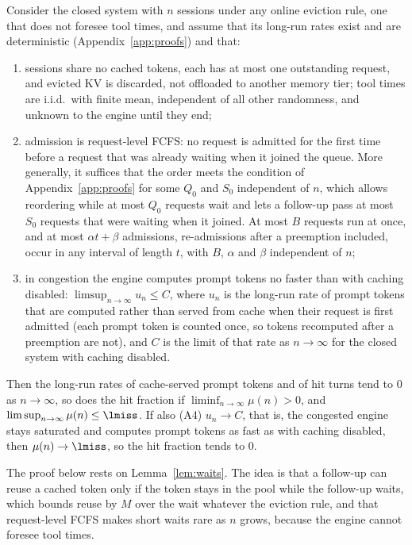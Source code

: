 \begin{proposition}\label{prop:A}
Consider the closed system with $n$ sessions under any online eviction rule, one that does not foresee tool times, and assume that its long-run rates exist and are deterministic (Appendix~\ref{app:proofs}) and that:
\begin{enumerate}[label=(A\arabic*),leftmargin=*]
\item sessions share no cached tokens, each has at most one outstanding request, and evicted KV is discarded, not offloaded to another memory tier; tool times are i.i.d.\ with finite mean, independent of all other randomness, and unknown to the engine until they end;
\item admission is request-level FCFS: no request is admitted for the first time before a request that was already waiting when it joined the queue. More generally, it suffices that the order meets the condition of Appendix~\ref{app:proofs} for some $Q_0$ and $S_0$ independent of $n$, which allows reordering while at most $Q_0$ requests wait and lets a follow-up pass at most $S_0$ requests that were waiting when it joined. At most $B$ requests run at once, and at most $\alpha t+\beta$ admissions, re-admissions after a preemption included, occur in any interval of length $t$, with $B$, $\alpha$ and $\beta$ independent of $n$;
\item in congestion the engine computes prompt tokens no faster than with caching disabled: $\limsup_{n\to\infty}u_n\le C$, where $u_n$ is the long-run rate of prompt tokens that are computed rather than served from cache when their request is first admitted (each prompt token is counted once, so tokens recomputed after a preemption are not), and $C$ is the limit of that rate as $n\to\infty$ for the closed system with caching disabled.
\end{enumerate}
Then the long-run rates of cache-served prompt tokens and of hit turns tend to 0 as $n\to\infty$, so does the hit fraction if $\liminf_{n\to\infty}\mu(n)>0$, and $\limsup_{n\to\infty}\mu(n)\le\lmiss$. If also (A4) $u_n\to C$, that is, the congested engine stays saturated and computes prompt tokens as fast as with caching disabled, then $\mu(n)\to\lmiss$, so the hit fraction tends to 0.
\end{proposition}
\noindent The proof below rests on Lemma~\ref{lem:waits}. The idea is that a follow-up can reuse a cached token only if the token stays in the pool while the follow-up waits, which bounds reuse by $M$ over the wait whatever the eviction rule, and that request-level FCFS makes short waits rare as $n$ grows, because the engine cannot foresee tool times.

